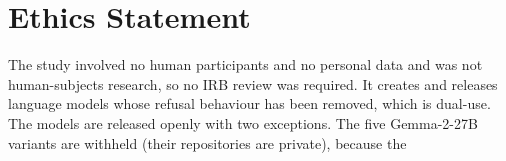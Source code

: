 \documentclass{article}
\begin{document}
\section*{Ethics Statement}
The study involved no human participants and no personal data and was not
human-subjects research, so no IRB review was required. It creates and
releases language models whose refusal behaviour has been removed, which is
dual-use. The models are released openly with two exceptions. The five
Gemma-2-27B variants are withheld (their repositories are private), because the
\end{document}
